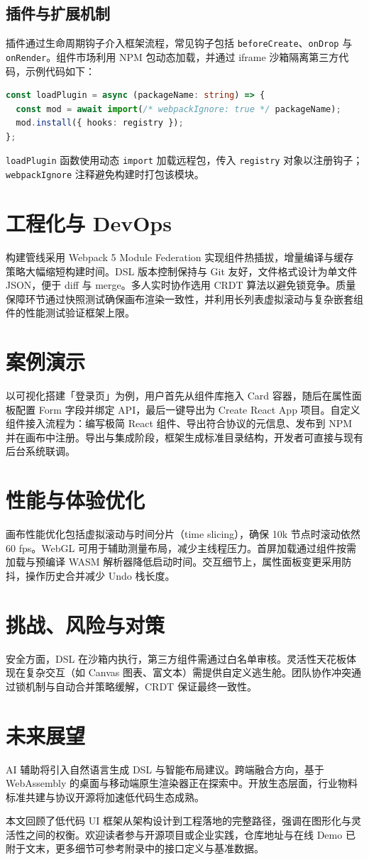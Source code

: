 \section{插件与扩展机制}
插件通过生命周期钩子介入框架流程，常见钩子包括 \texttt{beforeCreate}、\texttt{onDrop} 与 \texttt{onRender}。组件市场利用 NPM 包动态加载，并通过 iframe 沙箱隔离第三方代码，示例代码如下：\par
\begin{lstlisting}[language=ts]
const loadPlugin = async (packageName: string) => {
  const mod = await import(/* webpackIgnore: true */ packageName);
  mod.install({ hooks: registry });
};
\end{lstlisting}
\texttt{loadPlugin} 函数使用动态 \texttt{import} 加载远程包，传入 \texttt{registry} 对象以注册钩子；\texttt{webpackIgnore} 注释避免构建时打包该模块。\par
\chapter{工程化与 DevOps}
构建管线采用 Webpack 5 Module Federation 实现组件热插拔，增量编译与缓存策略大幅缩短构建时间。DSL 版本控制保持与 Git 友好，文件格式设计为单文件 JSON，便于 diff 与 merge。多人实时协作选用 CRDT 算法以避免锁竞争。质量保障环节通过快照测试确保画布渲染一致性，并利用长列表虚拟滚动与复杂嵌套组件的性能测试验证框架上限。\par
\chapter{案例演示}
以可视化搭建「登录页」为例，用户首先从组件库拖入 Card 容器，随后在属性面板配置 Form 字段并绑定 API，最后一键导出为 Create React App 项目。自定义组件接入流程为：编写极简 React 组件、导出符合协议的元信息、发布到 NPM 并在画布中注册。导出与集成阶段，框架生成标准目录结构，开发者可直接与现有后台系统联调。\par
\chapter{性能与体验优化}
画布性能优化包括虚拟滚动与时间分片（time slicing），确保 10k 节点时滚动依然 60 fps。WebGL 可用于辅助测量布局，减少主线程压力。首屏加载通过组件按需加载与预编译 WASM 解析器降低启动时间。交互细节上，属性面板变更采用防抖，操作历史合并减少 Undo 栈长度。\par
\chapter{挑战、风险与对策}
安全方面，DSL 在沙箱内执行，第三方组件需通过白名单审核。灵活性天花板体现在复杂交互（如 Canvas 图表、富文本）需提供自定义逃生舱。团队协作冲突通过锁机制与自动合并策略缓解，CRDT 保证最终一致性。\par
\chapter{未来展望}
AI 辅助将引入自然语言生成 DSL 与智能布局建议。跨端融合方向，基于 WebAssembly 的桌面与移动端原生渲染器正在探索中。开放生态层面，行业物料标准共建与协议开源将加速低代码生态成熟。\par
本文回顾了低代码 UI 框架从架构设计到工程落地的完整路径，强调在图形化与灵活性之间的权衡。欢迎读者参与开源项目或企业实践，仓库地址与在线 Demo 已附于文末，更多细节可参考附录中的接口定义与基准数据。\par
